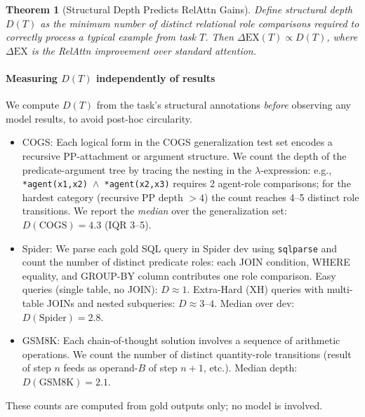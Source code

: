 \documentclass[conference]{IEEEtran}
\newtheorem{theorem}{Theorem}
\begin{document}
\begin{theorem}[Structural Depth Predicts RelAttn Gains]
\label{thm:app10}
Define structural depth $D(T)$ as the minimum number of distinct relational role comparisons required to correctly process a typical example from task $T$. Then $\Delta\mathrm{EX}(T) \propto D(T)$, where $\Delta\mathrm{EX}$ is the RelAttn improvement over standard attention.
\end{theorem}

\paragraph{Measuring $D(T)$ independently of results}
We compute $D(T)$ from the task's structural annotations \emph{before} observing any model results, to avoid post-hoc circularity.
\begin{itemize}[noitemsep,topsep=2pt]
  \item {COGS}: Each logical form in the COGS generalization test set encodes a recursive PP-attachment or argument structure. We count the depth of the predicate-argument tree by tracing the nesting in the $\lambda$-expression: e.g., \texttt{*agent(x1,x2) $\wedge$ *agent(x2,x3)} requires 2 agent-role comparisons; for the hardest category (recursive PP depth $> 4$) the count reaches 4--5 distinct role transitions. We report the \emph{median} over the generalization set: $D(\mathrm{COGS}) = 4.3$ (IQR 3--5).
  \item {Spider}: We parse each gold SQL query in Spider dev using \texttt{sqlparse} and count the number of distinct predicate roles: each JOIN condition, WHERE equality, and GROUP-BY column contributes one role comparison. Easy queries (single table, no JOIN): $D \approx 1$. Extra-Hard (XH) queries with multi-table JOINs and nested subqueries: $D \approx 3$--$4$. Median over dev: $D(\mathrm{Spider}) = 2.8$.
  \item {GSM8K}: Each chain-of-thought solution involves a sequence of arithmetic operations. We count the number of distinct quantity-role transitions (result of step $n$ feeds as operand-$B$ of step $n{+}1$, etc.). Median depth: $D(\mathrm{GSM8K}) = 2.1$.
\end{itemize}
These counts are computed from gold outputs only; no model is involved.
\end{document}
